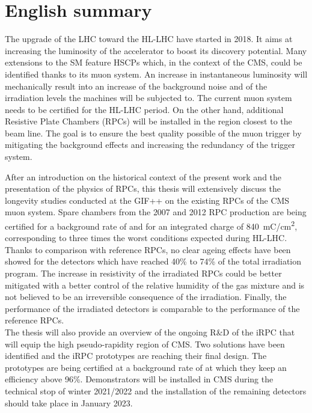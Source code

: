 \renewcommand{\thesection}{\arabic{section}}    %

\renewcommand{\bibname}{References}
\renewcommand\evenpagerightmark{{\scshape\small English summary}}
\renewcommand\oddpageleftmark{{\scshape\small English summary}}

\chapter[English summary]%
{English summary}

\hyphenation{}
\def\hyph{-\penalty0\hskip0pt\relax}

The upgrade of the \acf{LHC} toward the \acf{HL-LHC} have started in 2018. It aims at increasing the luminosity of the accelerator to boost its discovery potential. Many extensions to the \acf{SM} feature \acf{HSCPs} which, in the context of the \acf{CMS}, could be identified thanks to its muon system. An increase in instantaneous luminosity will mechanically result into an increase of the background noise and of the irradiation levels the machines will be subjected to. The current muon system needs to be certified for the HL-LHC period. On the other hand, additional Resistive Plate Chambers (RPCs) will be installed in the region closest to the beam line. The goal is to ensure the best quality possible of the muon trigger by mitigating the background effects and increasing the redundancy of the trigger system.

After an introduction on the historical context of the present work and the presentation of the physics of RPCs, this thesis will extensively discuss the longevity studies conducted at the \acf{GIF++} on the existing RPCs of the CMS muon system. Spare chambers from the 2007 and 2012 RPC production are being certified for a background rate of  and for an integrated charge of \SI{840}{mC/cm^2}, corresponding to three times the worst conditions expected during HL-LHC. Thanks to comparison with reference RPCs, no clear ageing effects have been showed for the detectors which have reached 40\% to 74\% of the total irradiation program. The increase in resistivity of the irradiated RPCs could be better mitigated with a better control of the relative humidity of the gas mixture and is not believed to be an irreversible consequence of the irradiation. Finally, the performance of the irradiated detectors is comparable to the performance of the reference RPCs.\\
The thesis will also provide an overview of the ongoing R\&D of the \acf{iRPC} that will equip the high pseudo-rapidity region of CMS. Two solutions have been identified and the iRPC prototypes are reaching their final design. The prototypes are being certified at a background rate of  at which they keep an efficiency above 96\%. Demonstrators will be installed in CMS during the technical stop of winter 2021/2022 and the installation of the remaining detectors should take place in January 2023.



\clearpage{\pagestyle{empty}\cleardoublepage}

\renewcommand*{\thesection}{\thechapter.\arabic{section}}       %


